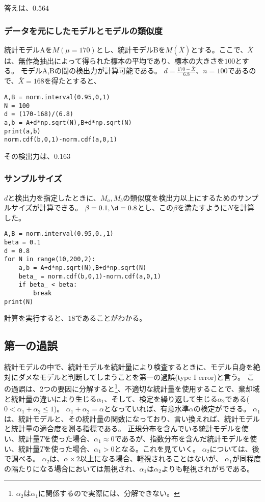 \documentclass[a4paper,11pt,dvipdfmx]{jsarticle}
\begin{document}
答えは、$0.564$

\subsubsection{データを元にしたモデルとモデルの類似度}
統計モデルAを$M(\mu=170)$とし、統計モデルBを$M(\bar{X})$とする。ここで、$\bar{X}$は、無作為抽出によって得られた標本の平均であり、標本の大きさを$100$とする。
モデルA,Bの間の検出力が計算可能である。
$d=\frac{170-\bar{X}}{6.8}$、$n=100$であるので、$\bar{X}=168$を得たとすると、
\begin{lstlisting}
A,B = norm.interval(0.95,0,1)
N = 100
d = (170-168)/(6.8)
a,b = A+d*np.sqrt(N),B+d*np.sqrt(N)
print(a,b)
norm.cdf(b,0,1)-norm.cdf(a,0,1)
\end{lstlisting}
その検出力は、$0.163$

\subsubsection{サンプルサイズ}
$d$と検出力を指定したときに、$M_a,M_b$の類似度を検出力以上にするためのサンプルサイズが計算できる。
$\beta=0.1,\d=0.8$とし、この$\beta$を満たすように$N$を計算した。

\begin{lstlisting}
A,B = norm.interval(0.95,0.,1)
beta = 0.1
d = 0.8
for N in range(10,200,2):
    a,b = A+d*np.sqrt(N),B+d*np.sqrt(N)
    beta_ = norm.cdf(b,0,1)-norm.cdf(a,0,1)
    if beta_ < beta:
        break
print(N)
\end{lstlisting}
計算を実行すると、$18$であることがわかる。


\subsection{第一の過誤}
統計モデルの中で、統計モデルを統計量により検査するときに、モデル自身を絶対にダメなモデルと判断してしまうことを第一の過誤(type I error)と言う。
この過誤は、2つの要因に分解すると\footnote{$\alpha_2$は$\alpha_1$に関係するので実際には、分解できない。}、不適切な統計量を使用することで、棄却域と統計量の違いにより生じる$\alpha_1$、そして、検定を繰り返して生じる$\alpha_2$である($0<\alpha_1+\alpha_2 \leq 1$)。
$\alpha_1+\alpha_2=\alpha$となっていれば、有意水準$\alpha$の検定ができる。
$\alpha_1$は、統計モデルと、その統計量の関数になっており、言い換えれば、統計モデルと統計量の適合度を測る指標である。
正規分布を含んでいる統計モデルを使い、統計量$T$を使った場合、$\alpha_1 \approx	 0 $であるが、指数分布を含んだ統計モデルを使い、統計量$T$を使った場合、$\alpha_1 > 0$となる。これを見ていく。
$\alpha_2$については、後で調べる。
$\alpha_2$は、$\alpha\times 2$以上になる場合、軽視されることはないが、
$\alpha_1$が同程度の隔たりになる場合においては無視され、$\alpha_1$は$\alpha_2$よりも軽視されがちである。
\end{document}
